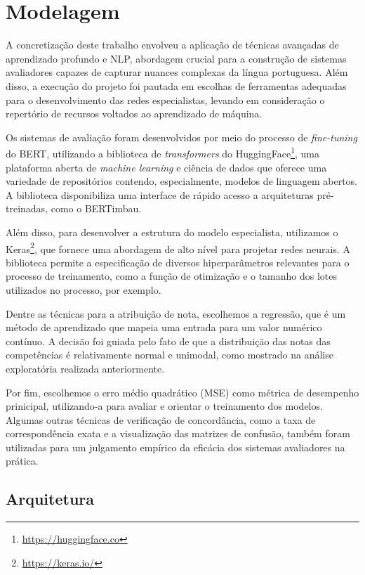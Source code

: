 \section{Modelagem}

A concretização deste trabalho envolveu a aplicação de técnicas avançadas de aprendizado profundo e NLP, abordagem crucial para a construção de sistemas avaliadores capazes de capturar nuances complexas da língua portuguesa. Além disso, a execução do projeto foi pautada em escolhas de ferramentas adequadas para o desenvolvimento das redes especialistas, levando em consideração o repertório de recursos voltados ao aprendizado de máquina.

Os sistemas de avaliação foram desenvolvidos por meio do processo de \textit{fine-tuning} do BERT, utilizando a biblioteca de \textit{transformers} do HuggingFace\footnote{\url{https://huggingface.co}}, uma plataforma aberta de \textit{machine learning} e ciência de dados que oferece uma variedade de repositórios contendo, especialmente, modelos de linguagem abertos. A biblioteca disponibiliza uma interface de rápido acesso a arquiteturas pré-treinadas, como o BERTimbau.

Além disso, para desenvolver a estrutura do modelo especialista, utilizamos o Keras\footnote{\url{https://keras.io/}}, que fornece uma abordagem de alto nível para projetar redes neurais. A biblioteca permite a especificação de diversos hiperparâmetros relevantes para o processo de treinamento, como a função de otimização e o tamanho dos lotes utilizados no processo, por exemplo.

Dentre as técnicas para a atribuição de nota, escolhemos a regressão, que é um método de aprendizado que mapeia uma entrada para um valor numérico contínuo. A decisão foi guiada pelo fato de que a distribuição das notas das competências é relativamente normal e unimodal, como mostrado na análise exploratória realizada anteriormente.

Por fim, escolhemos o erro médio quadrático (MSE) como métrica de desempenho prinicipal, utilizando-a para avaliar e orientar o treinamento dos modelos. Algumas outras técnicas de verificação de concordância, como a taxa de correspondência exata e a visualização das matrizes de confusão, também foram utilizadas para um julgamento empírico da eficácia dos sistemas avaliadores na prática.

\subsection{Arquitetura}

